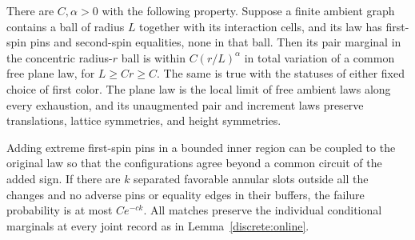 \begin{proposition}\label{prop:local-mixing}
There are $C,\alpha>0$ with the following property. Suppose a finite
ambient graph contains a ball of radius $L$ together with its interaction
cells, and its law has first-spin pins and second-spin equalities, none
in that ball. Then its
pair marginal in the concentric radius-$r$ ball is within
$C(r/L)^\alpha$ in total variation of a common free plane law, for
$L\ge Cr\ge C$. The same is true with the statuses of either fixed
choice of first color. The plane law is the local limit of free ambient
laws along every exhaustion, and its unaugmented pair and increment
laws preserve translations, lattice symmetries, and height symmetries.

Adding extreme first-spin pins in a bounded inner region can be coupled
to the original law so that the configurations agree beyond a common
circuit of the added sign. If there are $k$ separated favorable annular
slots outside all the changes and no adverse pins or equality edges in
their buffers, the failure probability is at most $Ce^{-ck}$.
All matches preserve the individual conditional marginals at every joint
record as in Lemma~\ref{discrete:online}.
\end{proposition}
